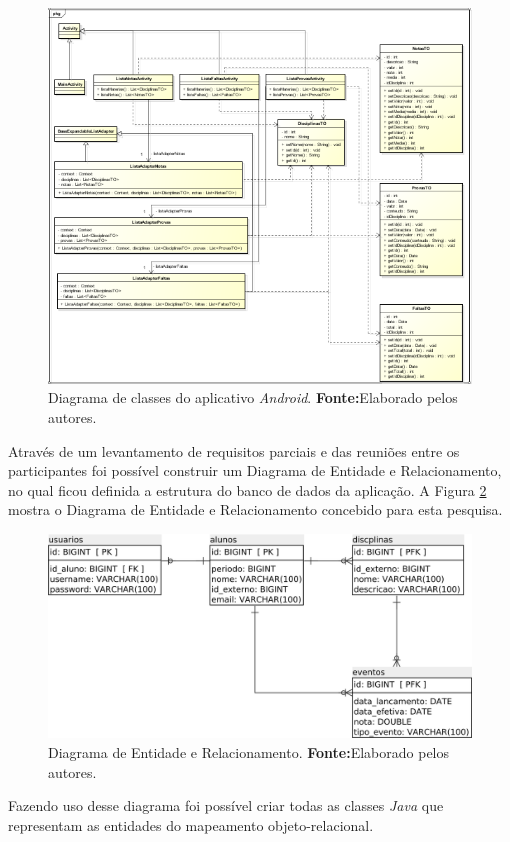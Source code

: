 		\pagebreak
		\begin{figure}[h!]
			\centerline{\includegraphics[scale=0.4]{./imagens/2_q_metodologico/qm7(1).png}}
			\caption[Diagrama de classes do aplicativo \textit{Android}]{Diagrama de
			classes do aplicativo \textit{Android}.
			 \textbf{Fonte:}Elaborado pelos autores.}
			\label{fig:qm7(1)}
		\end{figure}

		
	\par Através de um levantamento de requisitos parciais e das reuniões entre os
participantes foi possível construir um Diagrama de Entidade e Relacionamento,
no qual ficou definida a estrutura do banco de dados da aplicação. A Figura
\ref{fig:qm9} mostra o Diagrama de Entidade e Relacionamento concebido para
esta pesquisa.
	

		\begin{figure}[h!]
			\centerline{\includegraphics[scale=0.4]{./imagens/2_q_metodologico/qm9.png}}
			\caption[Diagrama de Entidade e Relacionamento]{Diagrama de Entidade e
			Relacionamento.
			\textbf{Fonte:}Elaborado pelos autores.}
			\label{fig:qm9}
		\end{figure}
		\pagebreak
		
		\par Fazendo uso desse diagrama foi possível criar todas as classes 
\textit{Java} que representam as entidades do mapeamento objeto-relacional.